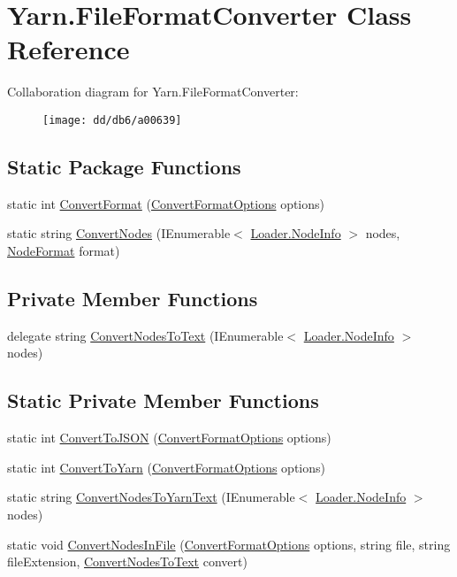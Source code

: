 \hypertarget{a00081}{\section{Yarn.\-File\-Format\-Converter Class Reference}
\label{a00081}
}


Collaboration diagram for Yarn.\-File\-Format\-Converter\-:
\nopagebreak
\begin{figure}[H]
\begin{center}
\leavevmode
\texttt{[image: dd/db6/a00639]}
\end{center}
\end{figure}
\subsection*{Static Package Functions}
\begin{DoxyCompactItemize}
\item 
static int \hyperlink{a00081_aa4db4ccac799c5f047a8b1a9efbe109d}{Convert\-Format} (\hyperlink{a00036}{Convert\-Format\-Options} options)
\item 
static string \hyperlink{a00081_a85596df924468279b2dc44a9f31d8bad}{Convert\-Nodes} (I\-Enumerable$<$ \hyperlink{a00112}{Loader.\-Node\-Info} $>$ nodes, \hyperlink{a00029_ad7ebb46e7309ead8767383a672b3272f}{Node\-Format} format)
\end{DoxyCompactItemize}
\subsection*{Private Member Functions}
\begin{DoxyCompactItemize}
\item 
delegate string \hyperlink{a00081_af9bd5d832fdd2bcbdc626d9f8632e05c}{Convert\-Nodes\-To\-Text} (I\-Enumerable$<$ \hyperlink{a00112}{Loader.\-Node\-Info} $>$ nodes)
\end{DoxyCompactItemize}
\subsection*{Static Private Member Functions}
\begin{DoxyCompactItemize}
\item 
static int \hyperlink{a00081_a28a086a7b44ecea7430af40436f38df6}{Convert\-To\-J\-S\-O\-N} (\hyperlink{a00036}{Convert\-Format\-Options} options)
\item 
static int \hyperlink{a00081_a1e6cd39b0c813f21da278367dcff76d2}{Convert\-To\-Yarn} (\hyperlink{a00036}{Convert\-Format\-Options} options)
\item 
static string \hyperlink{a00081_a282f283f02c9b1d3e53d813ec2f35233}{Convert\-Nodes\-To\-Yarn\-Text} (I\-Enumerable$<$ \hyperlink{a00112}{Loader.\-Node\-Info} $>$ nodes)
\item 
static void \hyperlink{a00081_aa72838be584177b5592c31d73c0febdb}{Convert\-Nodes\-In\-File} (\hyperlink{a00036}{Convert\-Format\-Options} options, string file, string file\-Extension, \hyperlink{a00081_af9bd5d832fdd2bcbdc626d9f8632e05c}{Convert\-Nodes\-To\-Text} convert)
\end{DoxyCompactItemize}


